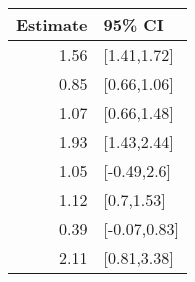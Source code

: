 \begin{tabular}{rl}
  \hline
Estimate & 95\% CI \\ 
  \hline
1.56 & [1.41,1.72] \\ 
  0.85 & [0.66,1.06] \\ 
  1.07 & [0.66,1.48] \\ 
  1.93 & [1.43,2.44] \\ 
  1.05 & [-0.49,2.6] \\ 
  1.12 & [0.7,1.53] \\ 
  0.39 & [-0.07,0.83] \\ 
  2.11 & [0.81,3.38] \\ 
   \hline
\end{tabular}

